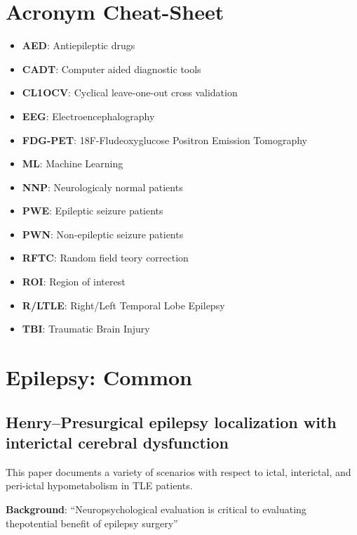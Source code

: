 \documentclass{article}
\begin{document}
\section{Acronym Cheat-Sheet}
\begin{itemize}
\item \textbf{AED}: Antiepileptic drugs
\item \textbf{CADT}: Computer aided diagnostic tools
\item \textbf{CL1OCV}: Cyclical leave-one-out cross validation
\item \textbf{EEG}: Electroencephalography
\item \textbf{FDG-PET}: 18F-Fludeoxyglucose Positron Emission Tomography
\item \textbf{ML}: Machine Learning
\item \textbf{NNP}: Neurologicaly normal patients
\item \textbf{PWE}: Epileptic seizure patients
\item \textbf{PWN}: Non-epileptic seizure patients
\item \textbf{RFTC}: Random field teory correction
\item \textbf{ROI}: Region of interest
\item \textbf{R/LTLE}: Right/Left Temporal Lobe Epilepsy
\item \textbf{TBI}: Traumatic Brain Injury

\end{itemize}

\section{Epilepsy: Common}
\subsection{Henry--Presurgical epilepsy localization with interictal cerebral
dysfunction}
This paper documents a variety of scenarios with respect to ictal, interictal,
and peri-ictal hypometabolism in TLE patients. 

\textbf{Background}: ``Neuropsychological evaluation is critical to evaluating
thepotential benefit of epilepsy surgery''
\end{document}
